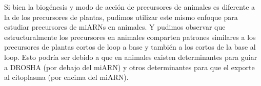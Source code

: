 Si bien la biogénesis y modo de acción de precursores de animales es diferente a la de los precursores de plantas, pudimos utilizar este mismo enfoque para estudiar precursores de miARNs en animales.
Y pudimos observar que estructuralmente los precursores en animales comparten patrones similares a los precursores de plantas cortos de loop a base y también a los cortos de la base al loop.
Esto podría ser debido a que en animales existen determinantes para guiar a DROSHA (por debajo del miARN) y otros determinantes para que el exporte al citoplasma (por encima del miARN).
